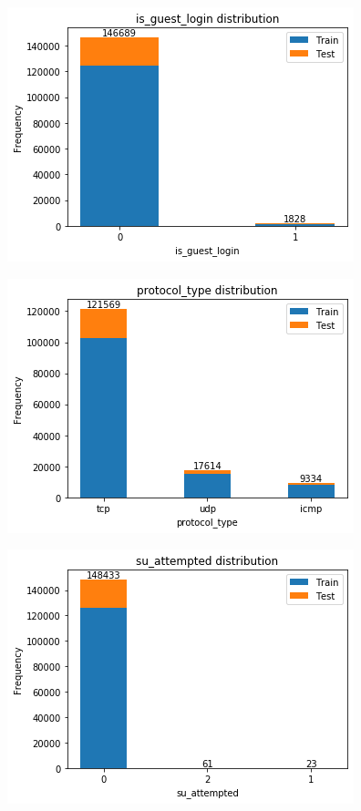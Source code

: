 \includegraphics[width=0.9\linewidth]{img/cat5.png}

\includegraphics[width=0.9\linewidth]{img/cat7.png}
      
\includegraphics[width=0.9\linewidth]{img/cat8.png}

